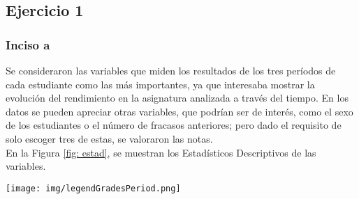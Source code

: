 \documentclass[a4paper,10pt,twocolumn]{article}
\begin{document}
  

	\subsection{Ejercicio 1}\label{sub:results1}
	\subsubsection{Inciso a} 
	Se consideraron las variables que miden los resultados de los tres períodos de cada estudiante como las más importantes, ya que interesaba mostrar la evolución del rendimiento en la asignatura analizada a través del tiempo. En los datos se pueden apreciar otras variables, que podrían ser de interés, como el sexo de los estudiantes o el número de fracasos anteriores; pero dado el requisito de solo escoger tres de estas, se valoraron las notas.
	\\
	En la Figura \ref{fig: estad}, se muestran los Estadísticos Descriptivos de las variables.
	
		\begin{center}
			{
			} \vspace{3mm}
			{
				}
			\label{fig: estad}
		\end{center}
			\hspace{7cm}\vspace{-1.5cm}\texttt{[image: img/legendGradesPeriod.png]}
		
\end{document}
